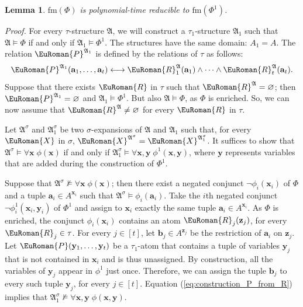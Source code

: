 \documentclass[10pt,a4paper]{amsart}
\theoremstyle{plain}
\newtheorem{lem}[thm]{Lemma}
\theoremstyle{definition}
\numberwithin{equation}{section}
\renewcommand{\proof}[1][Proof]{\par\noindent\textit{#1.}\enspace\ignorespaces}
\newcommand{\eurm}[1]{\EuRoman{#1}} %
\newcommand{\structure}[1]{\mathfrak{#1}} %
\newcommand{\tuple}[1]{\mathbf{#1}} %
\newcommand{\rel}[1]{\eurm{#1}} %
\newcommand{\Sat}[0]{\ensuremath{\mathrm{fm}}}
\begin{document}
\begin{lem}\label{lemma:one_symbol1} 
$\Sat(\Phi)$ is polynomial-time reducible to $\Sat(\Phi^1)$.
\end{lem}
\proof
For every $\tau$-structure $\structure{A}$, we will construct a $\tau_1$-structure $\structure{A}_1$ such that $\structure{A}\models\Phi$ if and only if $\structure{A}_1\models\Phi^1$.
The structures have the same domain: $A_1=A$.
The relation $\rel{P}^{\structure{A}_1}$ is defined by the relations of $\tau$ as follows:
\begin{equation}\label{eq:construction_P_from_R}
\rel{P}^{\structure{A}_1}(\tuple{a}_1,\ldots,\tuple{a}_t)\longleftrightarrow\rel{R}_1^\structure{A}(\tuple{a}_1)\wedge\dots\wedge\rel{R}_t^\structure{A}(\tuple{a}_t).
\end{equation} 
Suppose that there exists $\rel{R}$ in $\tau$ such that $\rel{R}^\structure{A}=\varnothing$; then $\rel{P}^{\structure{A}_1}=\varnothing$ and $\structure{A}_1\models\Phi^1$.
But also $\structure{A}\models\Phi$, as $\Phi$ is enriched.
So, we can now assume that $\rel{R}^\structure{A}\not=\varnothing$ for every $\rel{R}$ in $\tau$.



Let $\structure{A}^\sigma$ and $\structure{A}_1^\sigma$ be two $\sigma$-expansions of $\structure{A}$ and $\structure{A}_1$ such that, for every $\rel{X}$ in $\sigma$, $\rel{X}^{\structure{A}^\sigma}=\rel{X}^{\structure{A}_1^\sigma}$.
It suffices to show that $\structure{A}^\sigma\models\forall\tuple{x}\;\phi(\tuple{x})$ if and only if $\structure{A}_1^\sigma\models\forall\tuple{x},\tuple{y}\;\phi^1(\tuple{x},\tuple{y})$, where $\tuple{y}$ represents variables that are added during the construction of $\Phi^1$.

Suppose that $\structure{A}^\sigma\not\models\forall\tuple{x}\;\phi(\tuple{x})$; then there exist a negated conjunct $\neg\phi_i(\tuple{x}_i)$ of $\Phi$ and a tuple $\tuple{a}_i\in A^{\tuple{x}_i}$ such that  $\structure{A}^\sigma\models\phi_i(\tuple{a}_i)$.
Take the $i$th negated conjunct $\neg\phi_i^1(\tuple{x}_i,\tuple{y}_i)$ of $\Phi^1$ and assign to $\tuple{x}_i$ exactly the same tuple $\tuple{a}_i\in A^{\tuple{x}_i}$.
As $\Phi$ is enriched, the conjunct $\phi_i(\tuple{x}_i)$ contains an atom $\rel{R}_j(\tuple{z}_j)$, for every $\rel{R}_j\in\tau$.
For every $j\in[t]$, let $\tuple{b}_j\in A^{\tuple{z}_j}$ be the restriction of $\tuple{a}_i$ on $\tuple{z}_j$.
Let $\rel{P}(\tuple{y}_1,\ldots,\tuple{y}_t)$ be a $\tau_1$-atom that contains a tuple of variables $\tuple{y}_j$ that is not contained in $\tuple{x}_i$ and is thus unassigned.
By construction, all the variables of $\tuple{y}_j$ appear in $\phi^1$ just once.
Therefore, we can assign the tuple $\tuple{b}_j$ to every such tuple $\tuple{y}_j$, for every $j\in[t]$.
Equation (\ref{eq:construction_P_from_R}) implies that $\structure{A}_1^\sigma\not\models\forall\tuple{x},\tuple{y}\;\phi(\tuple{x},\tuple{y})$. 
\end{document}
